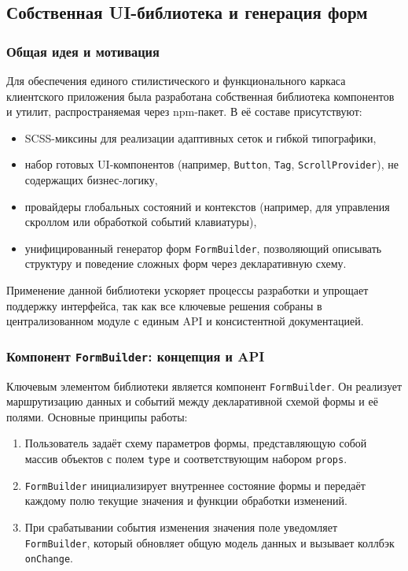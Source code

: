 \subsection{Собственная UI-библиотека и генерация форм}

\subsubsection{Общая идея и мотивация}
Для обеспечения единого стилистического и функционального каркаса клиентского приложения была разработана собственная библиотека компонентов и утилит, распространяемая через npm-пакет. В её составе присутствуют:
\begin{itemize}
  \item SCSS-миксины для реализации адаптивных сеток и гибкой типографики,
  \item набор готовых UI-компонентов (например, \texttt{Button}, \texttt{Tag}, \texttt{ScrollProvider}), не содержащих бизнес-логику,
  \item провайдеры глобальных состояний и контекстов (например, для управления скроллом или обработкой событий клавиатуры),
  \item унифицированный генератор форм \texttt{FormBuilder}, позволяющий описывать структуру и поведение сложных форм через декларативную схему.
\end{itemize}
Применение данной библиотеки ускоряет процессы разработки и упрощает поддержку интерфейса, так как все ключевые решения собраны в централизованном модуле с единым API и консистентной документацией.

\subsubsection{Компонент \texttt{FormBuilder}: концепция и API}
Ключевым элементом библиотеки является компонент \texttt{FormBuilder}. Он реализует маршрутизацию данных и событий между декларативной схемой формы и её полями. Основные принципы работы:
\begin{enumerate}
  \item Пользователь задаёт схему параметров формы, представляющую собой массив объектов с полем \texttt{type} и соответствующим набором \texttt{props}.
  \item \texttt{FormBuilder} инициализирует внутреннее состояние формы и передаёт каждому полю текущие значения и функции обработки изменений.
  \item При срабатывании события изменения значения поле уведомляет \texttt{FormBuilder}, который обновляет общую модель данных и вызывает коллбэк \texttt{onChange}.
\end{enumerate}


